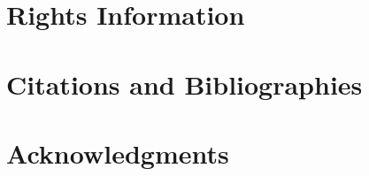 \documentclass[acmtog]{acmart}
\begin{document}



\section{Rights Information}







\section{Citations and Bibliographies}



\section{Acknowledgments}












\appendix
\end{document}
